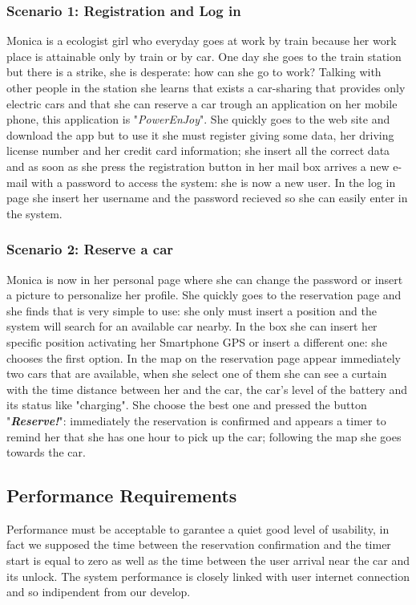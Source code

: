 \subsubsection{Scenario 1: Registration and Log in} \label{sce1}
Monica is a ecologist girl who everyday goes at work by train because her work place is attainable only by train or by car. One day she goes to the train station but there is a strike, she is desperate: how can she go to work? Talking with other people in the station she learns that exists a car-sharing that provides only electric cars and that she can reserve a car trough an application on her mobile phone, this application is "\textit{PowerEnJoy}". She quickly goes to the web site and download the app but to use it she must register giving some data, her driving license number and her credit card information; she insert all the correct data and as soon as she press the registration button in her mail box arrives a new e-mail with a password to access the system: she is now a new user. In the log in page she insert her username and the password recieved so she can easily enter in the system.
\subsubsection{Scenario 2: Reserve a car} \label{sce2}
Monica is now in her personal page where she can change the password or insert a picture to personalize her profile. She quickly goes to the reservation page and she finds that is very simple to use: she only must insert a position and the system will search for an available car nearby. In the box she can insert her specific position activating her Smartphone GPS or insert a different one: she chooses the first option. In the map on the reservation page appear immediately two cars that are available, when she select one of them she can see a curtain with the time distance between her and the car, the car's level of the battery and its status like "charging". She choose the best one and pressed the button "\textbf{\textit{Reserve!}}": immediately the reservation is confirmed and appears a timer to remind her that she has one hour to pick up the car; following the map she goes towards the car. 




\subsection{Performance Requirements} \label{sec:perf_requirements}
Performance must be acceptable to garantee a quiet good level of usability, in fact we supposed the time between the reservation confirmation and the timer start is equal to zero as well as the time between the user arrival near the car and its unlock. The system performance is closely linked with user internet connection and so indipendent from our develop.

